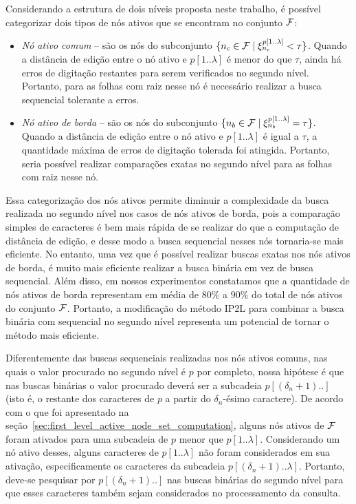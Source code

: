 Considerando a estrutura de dois níveis proposta neste trabalho, é possível categorizar dois tipos de nós ativos que se encontram no conjunto $\mathcal{F}$:

\begin{itemize}
    \item \textit{Nó ativo comum} -- são os nós do subconjunto $\{n_{c} \in \mathcal{F} \mid \xi_{n_{c}}^{p[1..\lambda]} < \tau \}$. Quando a distância de edição entre o nó ativo e $p[1..\lambda]$ é menor do que $\tau$, ainda há erros de digitação restantes para serem verificados no segundo nível. Portanto, para as folhas com raiz nesse nó é necessário realizar a busca sequencial tolerante a erros.
    \item \textit{Nó ativo de borda} -- são os nós do subconjunto $\{n_{b} \in \mathcal{F} \mid \xi_{n_{b}}^{p[1..\lambda]} = \tau \}$. Quando a distância de edição entre o nó ativo e $p[1..\lambda]$ é igual a $\tau$, a quantidade máxima de erros de digitação tolerada foi atingida. Portanto, seria possível realizar comparações exatas no segundo nível para as folhas com raiz nesse nó.
\end{itemize}

Essa categorização dos nós ativos permite diminuir a complexidade da busca realizada no segundo nível nos casos de nós ativos de borda, pois a comparação simples de caracteres é bem mais rápida de se realizar do que a computação de distância de edição, e desse modo a busca sequencial nesses nós tornaria-se mais eficiente. No entanto, uma vez que é possível realizar buscas exatas nos nós ativos de borda, é muito mais eficiente realizar a busca binária em vez de busca sequencial. Além disso, em nossos experimentos constatamos que a quantidade de nós ativos de borda representam em média de $80\%$ a $90\%$ do total de nós ativos do conjunto $\mathcal{F}$. Portanto, a modificação do método IP2L para combinar a busca binária com sequencial no segundo nível representa um potencial de tornar o método mais eficiente.

Diferentemente das buscas sequenciais realizadas nos nós ativos comuns, nas quais o valor procurado no segundo nível é $p$ por completo, nossa hipótese é que nas buscas binárias o valor procurado deverá ser a subcadeia $p[(\delta_{n} + 1)..]$ (isto é, o restante dos caracteres de $p$ a partir do $\delta_{n}$-ésimo caractere). De acordo com o que foi apresentado na seção~\ref{sec:first_level_active_node_set_computation}, alguns nós ativos de $\mathcal{F}$ foram ativados para uma subcadeia de $p$ menor que $p[1..\lambda]$. Considerando um nó ativo desses, alguns caracteres de $p[1..\lambda]$ não foram considerados em sua ativação, especificamente os caracteres da subcadeia $p[(\delta_{n}+1)..\lambda]$. Portanto, deve-se pesquisar por $p[(\delta_{n} + 1)..]$ nas buscas binárias do segundo nível para que esses caracteres também sejam considerados no processamento da consulta.

